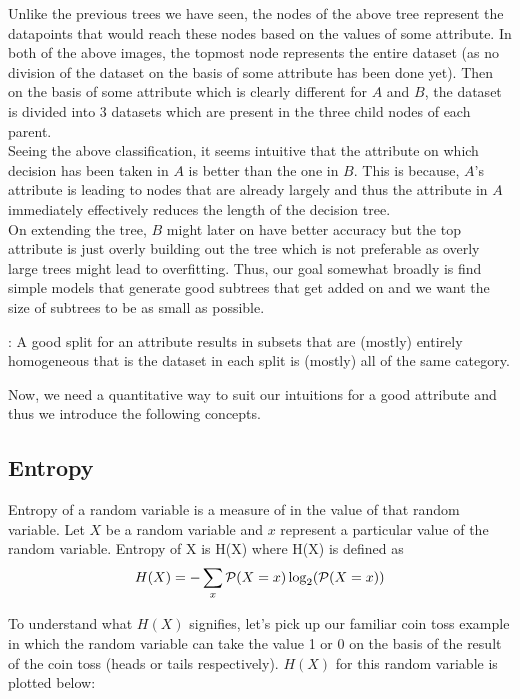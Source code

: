 Unlike the previous trees we have seen, the nodes of the above tree represent the datapoints that would reach these nodes based on the values of some attribute. In both of the above images, the topmost node represents the entire dataset (as no division of the dataset on the basis of some attribute has been done yet). Then on the basis of some attribute which is clearly different for $A$ and $B$, the dataset is divided into 3 datasets which are present in the three child nodes of each parent. \\

Seeing the above classification, it seems intuitive that the attribute on which decision has been taken in $A$ is better than the one in $B$. This is because, $A$'s attribute is leading to nodes that are already largely  and thus the attribute in $A$ immediately effectively reduces the length of the decision tree. \\

On extending the tree, $B$ might later on have better accuracy but the top attribute is just overly building out the tree which is not preferable as overly large trees might lead to overfitting. Thus, our goal somewhat broadly is find simple models that generate good subtrees that get added on and we want the size of subtrees to be as small as possible. \\

\begin{mdframed}
  : A good split for an attribute results in subsets that are (mostly) entirely homogeneous that is the dataset in each split is (mostly) all of the same category.
\end{mdframed}

Now, we need a quantitative way to suit our intuitions for a good attribute and thus we introduce the following concepts.

\subsection{Entropy}

Entropy of a random variable is a measure of  in the value of that random variable. Let $X$ be a random variable and $x$ represent a particular value of the random variable. Entropy  of X is H(X) where H(X) is defined as
$$
  H(X) =  -\sum_{x} \mathcal{P}(X=x)\log_{2} (\mathcal{P}(X=x))
$$

To understand what $H(X)$ signifies, let's pick up our familiar coin toss example in which the random variable can take the value 1 or 0 on the basis of the result of the coin toss (heads or tails respectively). $H(X)$ for this random variable is plotted below:

